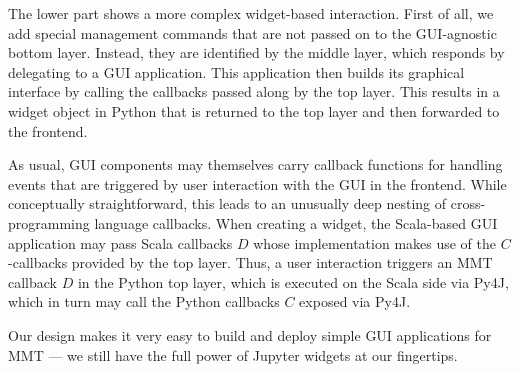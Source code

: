 The lower part shows a more complex widget-based interaction.
First of all, we add special management commands that are not passed on to the GUI-agnostic bottom layer.
Instead, they are identified by the middle layer, which responds by delegating to a GUI application.
This application then builds its graphical interface by calling the callbacks passed along by the top layer.
This results in a widget object in Python that is returned to the top layer and then forwarded to the frontend.

As usual, GUI components may themselves carry callback functions for handling events that are triggered by user interaction with the GUI in the frontend.
While conceptually straightforward, this leads to an unusually deep nesting of cross-programming language callbacks.
When creating a widget, the Scala-based GUI application may pass Scala callbacks $D$ whose implementation makes use of the $C$-callbacks provided by the top layer.
Thus, a user interaction triggers an MMT callback $D$ in the Python top layer, which is executed on the Scala side via Py4J, which in turn may call the Python callbacks $C$ exposed via Py4J.

Our design makes it very easy to build and deploy simple GUI applications for MMT --- we still have the full power of Jupyter widgets at our fingertips.

%
%


